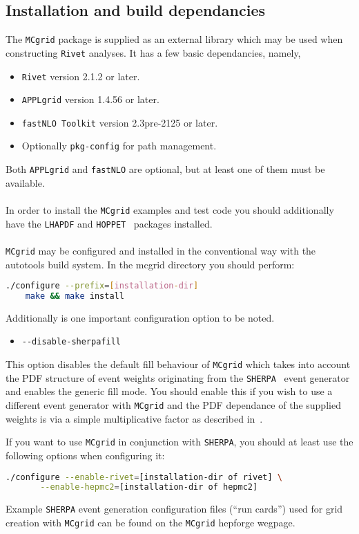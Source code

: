\documentclass[11pt]{article}
\newcommand{\mcgrid} {{\tt MCgrid}\xspace}
\newcommand{\rivet} {{\tt Rivet}\xspace}
\newcommand{\appl} {{\tt APPLgrid}\xspace}
\newcommand{\fnlo} {{\tt fastNLO}\xspace}
\newcommand{\sherpa} {{\tt SHERPA}\xspace}
\begin{document}
\subsection{Installation and build dependancies}
The \mcgrid package is supplied as an external library which may be used when constructing \rivet analyses. It has a few basic dependancies, namely,
\begin{itemize}
\item \rivet version 2.1.2 or later.
\item \appl version 1.4.56 or later.
\item \fnlo\ {\tt Toolkit} version 2.3pre-2125 or later.
\item Optionally {\tt pkg-config} for path management.
\end{itemize}
Both \appl and \fnlo are optional, but at least one of them must be available.
\\\\
In order to install the \mcgrid examples and test code you should additionally have the {\tt LHAPDF} and {\tt HOPPET}~\cite{Salam:2008qg} packages installed. 
\\\\
\mcgrid may be configured and installed in the conventional way with the autotools build system. In the mcgrid directory you should perform:
\begin{lstlisting}[language=bash]
	./configure --prefix=[installation-dir]
	make && make install
\end{lstlisting}
Additionally is one important configuration option to be noted.
\begin{itemize}
\item \lstinline[language=bash]{--disable-sherpafill }
\end{itemize}
This option disables the default fill behaviour of \mcgrid which takes into account the PDF structure of event weights originating from the \sherpa~\cite{Gleisberg:2008ta} event generator and enables the generic fill mode. You should enable this if you wish to use a different event generator with \mcgrid and the PDF dependance of the supplied weights is via a simple multiplicative factor as described in~\cite{cpc}.

If you want to use \mcgrid in conjunction with \sherpa,
you should at least use the following options when configuring it:
\begin{lstlisting}[language=bash]
	./configure --enable-rivet=[installation-dir of rivet] \
	   --enable-hepmc2=[installation-dir of hepmc2]
\end{lstlisting}
Example \sherpa event generation configuration files (``run cards'')
used for grid creation with \mcgrid can be found on the \mcgrid hepforge wegpage.
\end{document}

